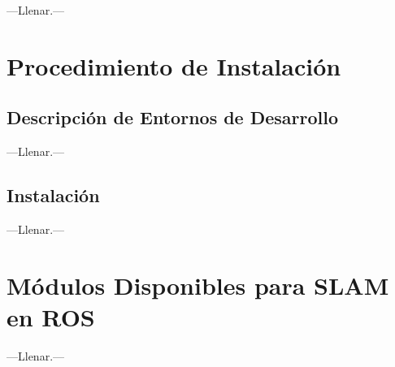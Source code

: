 ---Llenar.---

\section{Procedimiento de Instalación}

\subsection{Descripción de Entornos de Desarrollo}

---Llenar.---

\subsection{Instalación}

---Llenar.---

\section{Módulos Disponibles para SLAM en ROS}

---Llenar.---